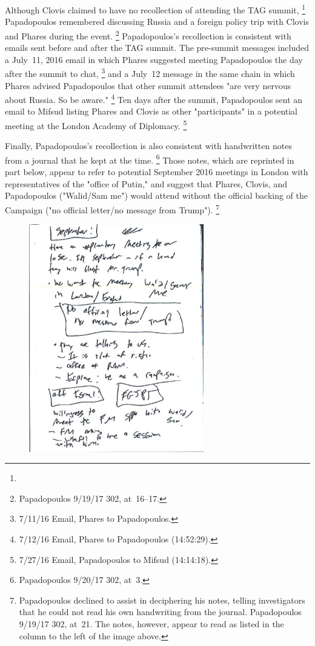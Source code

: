 Although Clovis claimed to have no recollection of attending the TAG summit,%
\footnote{}
Papadopoulos remembered discussing Russia and a foreign policy trip with Clovis and Phares during the event.%
\footnote{Papadopoulos 9/19/17 302, at~16--17.}
Papadopoulos's recollection is consistent with emails sent before and after the TAG summit.
The pre-summit messages included a July~11, 2016 email in which Phares suggested meeting Papadopoulos the day after the summit to chat,%
\footnote{7/11/16 Email, Phares to Papadopoulos.}
and a July~12 message in the same chain in which Phares advised Papadopoulos that other summit attendees "are very nervous about Russia. So be aware."%
\footnote{7/12/16 Email, Phares to Papadopoulos (14:52:29).}
Ten days after the summit, Papadopoulos sent an email to Mifsud listing Phares and Clovis as other "participants" in a potential meeting at the London Academy of Diplomacy.%
\footnote{7/27/16 Email, Papadopoulos to Mifsud (14:14:18).}

Finally, Papadopoulos's recollection is also consistent with handwritten notes from a journal that he kept at the time.%
\footnote{Papadopoulos 9/20/17 302, at~3.}
Those notes, which are reprinted in part below, appear to refer to potential September 2016 meetings in London with representatives of the "office of Putin," and suggest that Phares, Clovis, and Papadopoulos ("Walid/Sam me") would attend without the official backing of the Campaign ("no official letter/no message from Trump").%
\footnote{Papadopoulos declined to assist in deciphering his notes, telling investigators that he could not read his own handwriting from the journal.
Papadopoulos 9/19/17 302, at~21.
The notes, however, appear to read as listed in the column to the left of the image above.}

\begin{figure}
    \vspace{-20pt}
    \begin{center}
        \includegraphics[width=3in]{images/p-92-papadopolous-notes.png}%
    \end{center}
    \vspace{-20pt}
    \caption*{}
    \vspace{-10pt}
    \label{fig:papadopolous-notes}
\end{figure}

